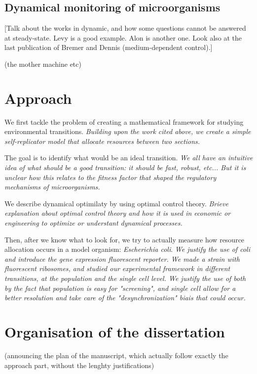 \subsection{Dynamical monitoring of microorganisms}

[Talk about the works in dynamic, and how some questions cannot be answered at steady-state.
Levy is a good example. Alon is another one. Look also at the last publication of Bremer and Dennis (medium-dependent control).]

(the mother machine etc)

\section{Approach}

We first tackle the problem of creating a mathematical framework for studying environmental transitions.
\textit{Building upon the work cited above, we create a simple self-replicator model that allocate resources between two sections.}

The goal is to identify what would be an ideal transition.
\textit{We all have an intuitive idea of what should be a good transition: it should be fast, robust, etc... But it is unclear how this relates to the fitness factor that shaped the regulatory mechanisms of microorganisms.}

We describe dynamical optimilaty by using optimal control theory.
\textit{Brieve explanation about optimal control theory and how it is used in economic or engineering to optimize or understant dynamical processes.}

Then, after we know what to look for, we try to actually measure how resource allocation occurs in a model organism: \textit{Escherichia coli}.
\textit{We justify the use of coli and introduce the gene expression fluorescent reporter.
We made a strain with fluorescent ribosomes, and studied our experimental framework in different transitions, at the population and the single cell level.
We justify the use of both by the fact that population is easy for "screening", and single cell allow for a better resolution and take care of the "desynchronization" biais that could occur.}

\section{Organisation of the dissertation}

(announcing the plan of the manuscript, which actually follow exactly the approach part, without the lenghty justifications)